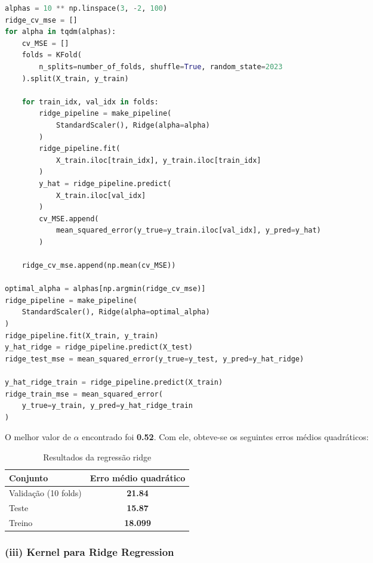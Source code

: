 \begin{lstlisting}[language=Python]
alphas = 10 ** np.linspace(3, -2, 100)
ridge_cv_mse = []
for alpha in tqdm(alphas):
    cv_MSE = []
    folds = KFold(
        n_splits=number_of_folds, shuffle=True, random_state=2023
    ).split(X_train, y_train)

    for train_idx, val_idx in folds:
        ridge_pipeline = make_pipeline(
            StandardScaler(), Ridge(alpha=alpha)
        )
        ridge_pipeline.fit(
            X_train.iloc[train_idx], y_train.iloc[train_idx]
        )
        y_hat = ridge_pipeline.predict(
            X_train.iloc[val_idx]
        )
        cv_MSE.append(
            mean_squared_error(y_true=y_train.iloc[val_idx], y_pred=y_hat)
        )

    ridge_cv_mse.append(np.mean(cv_MSE))

optimal_alpha = alphas[np.argmin(ridge_cv_mse)]
ridge_pipeline = make_pipeline(
    StandardScaler(), Ridge(alpha=optimal_alpha)
)
ridge_pipeline.fit(X_train, y_train)
y_hat_ridge = ridge_pipeline.predict(X_test)
ridge_test_mse = mean_squared_error(y_true=y_test, y_pred=y_hat_ridge)

y_hat_ridge_train = ridge_pipeline.predict(X_train)
ridge_train_mse = mean_squared_error(
    y_true=y_train, y_pred=y_hat_ridge_train
)
\end{lstlisting}

O melhor valor de $\alpha$ encontrado foi \textbf{0.52}. Com ele, obteve-se os seguintes erros médios
quadráticos:

\begin{table}[h!]
    \centering
    \begin{tabular}{|l|c|}
        \hline
        Conjunto             & Erro médio quadrático \\ \hline
        Validação (10 folds) & \textbf{21.84}        \\
        Teste                & \textbf{15.87}        \\
        Treino               & \textbf{18.099}       \\
        \hline
    \end{tabular}
    \caption{Resultados da regressão ridge}
\end{table}
\newpage
\subsubsection*{(iii) Kernel para Ridge Regression}

